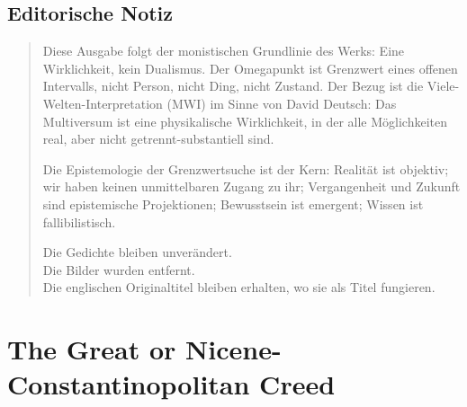 \documentclass[
  ngerman,
]{article}
\author{}
\date{}
\begin{document}
{
\setcounter{tocdepth}{3}
\tableofcontents
}
\subsection{\texorpdfstring{\textbf{Editorische
Notiz}}{Editorische Notiz}}\label{editorische-notiz}

\begin{quote}
Diese Ausgabe folgt der monistischen Grundlinie des Werks: Eine
Wirklichkeit, kein Dualismus. Der Omegapunkt ist Grenzwert eines offenen
Intervalls, nicht Person, nicht Ding, nicht Zustand. Der Bezug ist die
Viele-Welten-Interpretation (MWI) im Sinne von David Deutsch: Das
Multiversum ist eine physikalische Wirklichkeit, in der alle
Möglichkeiten real, aber nicht getrennt-substantiell sind.

Die Epistemologie der Grenzwertsuche ist der Kern: Realität ist
objektiv; wir haben keinen unmittelbaren Zugang zu ihr; Vergangenheit
und Zukunft sind epistemische Projektionen; Bewusstsein ist emergent;
Wissen ist fallibilistisch.

Die Gedichte bleiben unverändert.\\
Die Bilder wurden entfernt.\\
Die englischen Originaltitel bleiben erhalten, wo sie als Titel
fungieren.
\end{quote}

\section{\texorpdfstring{\hfill\break
}{ }}\label{section}

\section{\texorpdfstring{\textbf{The Great or Nicene-Constantinopolitan
Creed}}{The Great or Nicene-Constantinopolitan Creed}}\label{the-great-or-nicene-constantinopolitan-creed}
\end{document}
